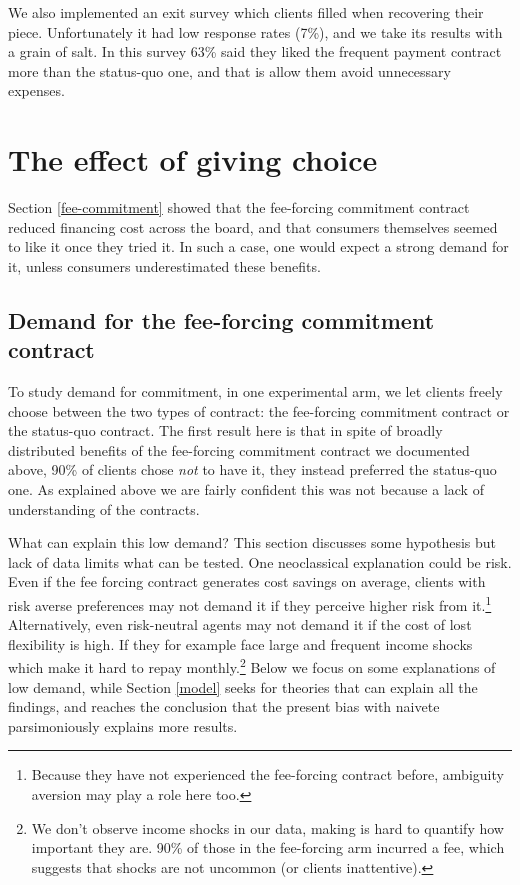 \documentclass[11pt]{article}
\begin{document}
We also implemented an exit survey which clients filled when recovering their piece. Unfortunately it had low response rates (7\%), and we take its results with a grain of salt. In this survey 63\% said they liked the frequent payment contract more than the status-quo one, and that is allow them avoid unnecessary expenses. 



\section{The effect of giving choice} \label{fee-choice}

Section \ref{fee-commitment} showed that the fee-forcing commitment contract reduced financing cost across the board, and that consumers themselves seemed to like it once they tried it. In such a case, one would expect a strong demand for it, unless consumers underestimated these benefits. 

\subsection{Demand for the fee-forcing commitment contract} \label{sec:demand}

To study demand for commitment, in one experimental arm, we let clients freely choose between the two types of contract: the fee-forcing commitment contract or the status-quo contract. The first result here is that in spite of broadly distributed benefits of the fee-forcing commitment contract we documented above, 90\% of clients chose \textit{not} to have it, they instead preferred the status-quo one. As explained above we are fairly confident this was not because a lack of understanding of the contracts. 

What can explain this low demand? This section discusses some hypothesis but lack of data limits what can be tested. One neoclassical explanation could be risk. Even if the fee forcing contract generates cost savings on average, clients with risk averse preferences may not demand it if they perceive higher risk from it.\footnote{Because they have not experienced the fee-forcing contract before, ambiguity aversion may play a role here too.} Alternatively, even risk-neutral agents may not demand it if the cost of lost flexibility is high. If they for example face large and frequent income shocks which make it hard to repay monthly.\footnote{We don't observe income shocks in our data, making is hard to quantify how important they are. 90\% of those in the fee-forcing arm incurred a fee, which suggests that shocks are not uncommon (or clients inattentive).} Below we focus on some explanations of low demand, while Section \ref{model} seeks for theories that can explain all the findings, and reaches the conclusion that the present bias with naivete parsimoniously explains more results.
\end{document}
